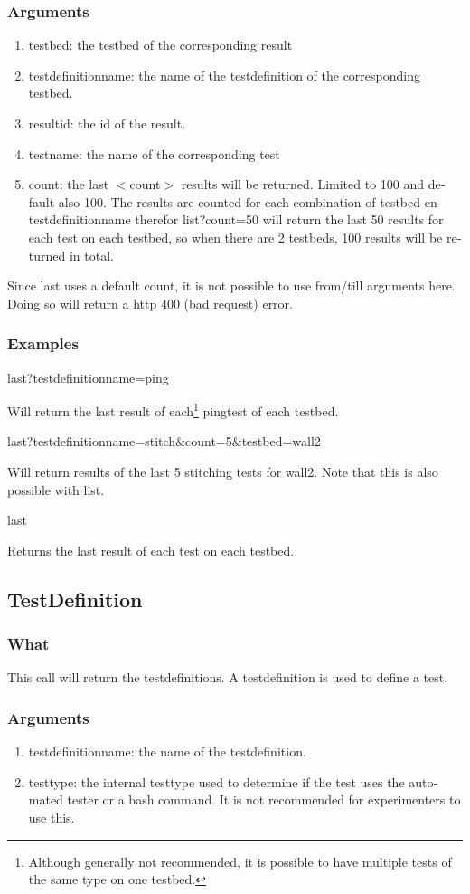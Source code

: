\begin{otherlanguage}{english}
\subsubsection{Arguments}
\begin{enumerate}
\item testbed: the testbed of the corresponding result
\item testdefinitionname: the name of the testdefinition of the corresponding testbed.
\item resultid: the id of the result.
\item testname: the name of the corresponding test
\item count: the last $<$count$>$ results will be returned. Limited to 100 and default also 100. The results are counted for each combination of testbed en testdefinitionname therefor list?count=50 will return the last 50 results for each test on each testbed, so when there are 2 testbeds, 100 results will be returned in total.
\end{enumerate}
\npar
Since last uses a default count, it is not possible to use from/till arguments here. Doing so will return a http 400 (bad request) error.
\subsubsection{Examples}
\begin{lt}
last?testdefinitionname=ping
\end{lt}
Will return the last result of each\footnote{Although generally not recommended, it is possible to have multiple tests of the same type on one testbed.} pingtest of each testbed.
\npar
\begin{lt}
last?testdefinitionname=stitch&count=5&testbed=wall2
\end{lt}
Will return results of the last 5 stitching tests for wall2. Note that this is also possible with list.
\npar
\begin{lt}
last
\end{lt}
Returns the last result of each test on each testbed.
\clearpage
\subsection{TestDefinition}
\subsubsection{What}
This call will return the testdefinitions. A testdefinition is used to define a test.
\subsubsection{Arguments}
\begin{enumerate}
\item testdefinitionname: the name of the testdefinition.
\item testtype: the internal testtype used to determine if the test uses the automated tester or a bash command. It is not recommended for experimenters to use this.
\end{enumerate}

\end{otherlanguage}
